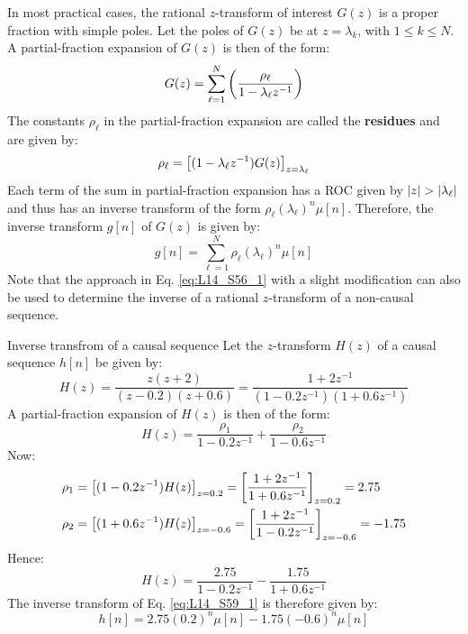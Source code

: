 \documentclass[../../main/main.tex]{subfiles}
\begin{document}
In most practical cases, the rational \( z \)-transform of interest \( G(z) \) is a proper fraction with simple poles. Let the poles of \( G(z) \) be at \( z = \lambda_{k} \), with \( 1 \le k \le N \). A partial-fraction expansion of \( G(z) \) is then of the form:
\begin{equation}
    G(z)
    =
    \sum_{\ell=1}^{N} \qty(\frac{\rho_{\ell}}{1 - \lambda_{\ell}z^{-1}})
    \label{eq:L14_S54_1}
\end{equation}
The constants \( \rho_{\ell} \) in the partial-fraction expansion are called the \textbf{residues} and are given by:
\begin{equation}
    \rho_{\ell}
    =
    \qty[(1 - \lambda_{\ell}z^{-1}) G(z)]_{z=\lambda_{\ell}}
    \label{eq:L14_S55_1}
\end{equation}
Each term of the sum in partial-fraction expansion has a ROC given by \( \abs{z} > \abs{\lambda_{\ell}} \) and thus has an inverse transform of the form \( \rho_{\ell}(\lambda_{\ell})^{n} \mu[n] \).
Therefore, the inverse transform \( g[n] \) of \( G(z) \) is given by:
\begin{equation}
    g[n]
    =
    \sum_{\ell=1}^{N} \rho_{\ell} (\lambda_{\ell})^{n} \mu[n]
    \label{eq:L14_S56_1}
\end{equation}
Note that the approach in Eq. \ref{eq:L14_S56_1} with a slight modification can also be used to determine the inverse of a rational \( z \)-transform of a non-causal sequence.

\begin{example}{Inverse transfrom of a causal sequence}{}
    Let the \( z \)-transform \( H(z) \) of a causal sequence \( h[n] \) be given by:
    \begin{equation}
        H(z)
        =
        \frac{z(z+2)}{(z-0.2)(z+0.6)}
        =
        \frac{1 + 2z^{-1}}{(1-0.2z^{-1})(1 + 0.6z^{-1})}
        \label{eq:L14_S57_1}
    \end{equation}
    A partial-fraction expansion of \( H(z) \) is then of the form:
    \begin{equation}
        H(z)
        =
        \frac{\rho_{1}}{1 - 0.2z^{-1}} + \frac{\rho_{2}}{1 - 0.6z^{-1}}
        \label{eq:L14_S57_2}
    \end{equation}
    Now:
    \begin{align}
        \rho_{1} &= \qty[(1-0.2z^{-1})H(z)]_{z=0.2} = \qty[\frac{1+2z^{-1}}{1+0.6z^{-1}}]_{z=0.2} = 2.75    \\
        \rho_{2} &= \qty[(1+0.6z^{-1})H(z)]_{z=-0.6} = \qty[\frac{1+2z^{-1}}{1-0.2z^{-1}}]_{z=-0.6} = -1.75
    \end{align}
    Hence:
    \begin{equation}
        H(z)
        =
        \frac{2.75}{1 - 0.2z^{-1}} - \frac{1.75}{1 + 0.6z^{-1}}
        \label{eq:L14_S59_1}
    \end{equation}
    The inverse transform of Eq. \ref{eq:L14_S59_1} is therefore given by:
    \begin{equation}
        h[n]
        =
        2.75(0.2)^{n} \mu[n] - 1.75(-0.6)^{n} \mu[n]
        \label{eq:L14_S59_2}
    \end{equation}
\end{example}
\end{document}
